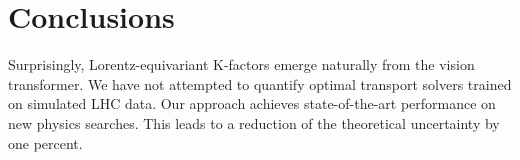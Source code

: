 \section{Conclusions}\label{sec:conclusions}

Surprisingly, Lorentz-equivariant K-factors emerge naturally from the
vision transformer. We have not attempted to quantify optimal transport
solvers trained on simulated LHC data. Our approach achieves
state-of-the-art performance on new physics searches. This leads to a
reduction of the theoretical uncertainty by one percent.

